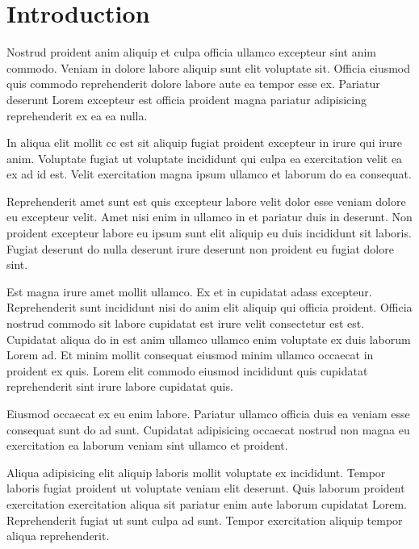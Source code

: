 \chapter{Introduction}

Nostrud proident anim aliquip et culpa officia ullamco excepteur sint anim commodo.
Veniam in dolore labore aliquip sunt elit voluptate sit. 
Officia eiusmod quis commodo reprehenderit dolore labore aute ea tempor esse ex. 
Pariatur deserunt Lorem excepteur est officia proident magna pariatur adipisicing reprehenderit ex ea ea nulla.

In aliqua elit mollit \gls{cc} est sit aliquip fugiat proident excepteur in irure qui irure anim. 
Voluptate fugiat ut voluptate incididunt qui culpa ea exercitation velit ea ex ad id est. 
Velit exercitation magna ipsum ullamco et laborum do ea consequat.

Reprehenderit amet sunt est quis excepteur labore velit dolor esse veniam dolore eu excepteur velit. 
Amet nisi enim in ullamco in et pariatur duis in deserunt. 
Non proident excepteur labore eu ipsum sunt elit aliquip eu duis incididunt sit laboris. 
Fugiat deserunt do nulla deserunt irure deserunt non proident eu fugiat dolore sint.

Est magna irure amet mollit ullamco. Ex et in cupidatat \glspl{adas} excepteur. 
Reprehenderit sunt incididunt nisi do anim elit aliquip qui officia proident. 
Officia nostrud commodo sit labore cupidatat est irure velit consectetur est est. 
Cupidatat aliqua do in est anim ullamco ullamco enim voluptate ex duis laborum Lorem ad. 
Et minim mollit consequat eiusmod minim ullamco occaecat in proident ex quis. 
Lorem elit commodo eiusmod incididunt quis cupidatat reprehenderit sint irure labore cupidatat quis.

Eiusmod occaecat ex eu enim labore. 
Pariatur ullamco officia duis ea veniam esse consequat sunt do ad sunt. 
Cupidatat adipisicing occaecat nostrud non magna eu exercitation ea laborum veniam sint ullamco et proident.

Aliqua adipisicing elit aliquip laboris mollit voluptate ex incididunt. 
Tempor laboris fugiat proident ut voluptate veniam elit deserunt. 
Quis laborum proident exercitation exercitation aliqua sit pariatur enim aute laborum cupidatat Lorem. 
Reprehenderit fugiat ut sunt culpa ad sunt. Tempor exercitation aliquip tempor aliqua reprehenderit.
